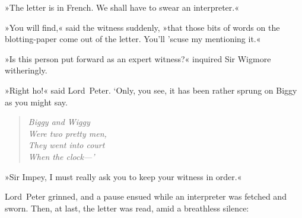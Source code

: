 »The letter is in French. We shall have to swear an interpreter.«

»You will find,« said the witness suddenly, »that those bits of
words on the blotting-paper come out of the letter. You'll 'scuse my
mentioning it.«

»Is this person put forward as an expert witness?« inquired Sir Wigmore
witheringly.

»Right ho!« said Lord~Peter. `Only, you see, it has been rather sprung
on Biggy as you might say.

\begin{quote}\itshape
Biggy and Wiggy\\
Were two pretty men,\\
They went into court\\
When the clock—'
\end{quote}

»Sir Impey, I must really ask you to keep your witness in order.«

Lord~Peter grinned, and a pause ensued while an interpreter was fetched
and sworn. Then, at last, the letter was read, amid a breathless
silence:


